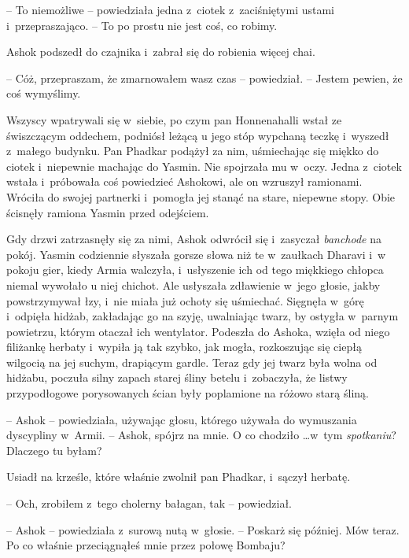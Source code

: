 \documentclass[oneside,polish,11pt,rmheadings]{mwbk}
\begin{document}
-- To niemożliwe -- powiedziała jedna z~ciotek z~zaciśniętymi ustami i~przepraszająco. -- To po prostu nie jest coś, co robimy.

Ashok podszedł do czajnika i~zabrał się do robienia więcej chai. 

-- Cóż, przepraszam, że zmarnowałem wasz czas -- powiedział. -- Jestem pewien, że coś wymyślimy.

Wszyscy wpatrywali się w~siebie, po czym pan Honnenahalli wstał ze świszczącym oddechem, podniósł leżącą u jego stóp wypchaną teczkę i~wyszedł z~małego budynku. Pan Phadkar podążył za nim, uśmiechając się miękko do ciotek i~niepewnie machając do Yasmin. Nie spojrzała mu w~oczy. Jedna z~ciotek wstała i~próbowała coś powiedzieć Ashokowi, ale on wzruszył ramionami. Wróciła do swojej partnerki i~pomogła jej stanąć na stare, niepewne stopy. Obie ścisnęły ramiona Yasmin przed odejściem.

Gdy drzwi zatrzasnęły się za nimi, Ashok odwrócił się i~zasyczał \textit{banchode} na pokój. Yasmin codziennie słyszała gorsze słowa niż te w~zaułkach Dharavi i~w pokoju gier, kiedy Armia walczyła, i~usłyszenie ich od tego miękkiego chłopca niemal wywołało u niej chichot. Ale usłyszała zdławienie w~jego głosie, jakby powstrzymywał łzy, i~nie miała już ochoty się uśmiechać. Sięgnęła w~górę i~odpięła hidżab, zakładając go na szyję, uwalniając twarz, by ostygła w~parnym powietrzu, którym otaczał ich wentylator. Podeszła do Ashoka, wzięła od niego filiżankę herbaty i~wypiła ją tak szybko, jak mogła, rozkoszując się ciepłą wilgocią na jej suchym, drapiącym gardle. Teraz gdy jej twarz była wolna od hidżabu, poczuła silny zapach starej śliny betelu i~zobaczyła, że listwy przypodłogowe porysowanych ścian były poplamione na różowo starą śliną.

-- Ashok -- powiedziała, używając głosu, którego używała do wymuszania dyscypliny w~Armii. -- Ashok, spójrz na mnie. O co chodziło \ldots  w~tym \textit{spotkaniu}? Dlaczego tu byłam?

Usiadł na krześle, które właśnie zwolnił pan Phadkar, i~sączył herbatę.

-- Och, zrobiłem z~tego cholerny bałagan, tak -- powiedział.

-- Ashok -- powiedziała z~surową nutą w~głosie. -- Poskarż się później. Mów teraz. Po co właśnie przeciągnąłeś mnie przez połowę Bombaju?
\end{document}
